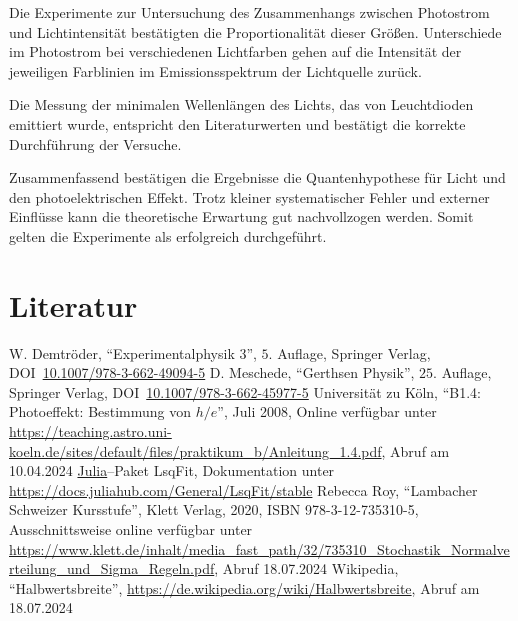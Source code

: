 \documentclass[12pt,a4paper]{scrartcl}
\numberwithin{equation}{section} %
\newcommand{\code}[1]{\textsf{#1}}
\begin{document}
Die Experimente zur Untersuchung des Zusammenhangs zwischen Photostrom und Lichtintensität bestätigten die Proportionalität dieser Größen. Unterschiede im Photostrom bei verschiedenen Lichtfarben gehen auf die Intensität der jeweiligen Farblinien im Emissionsspektrum der Lichtquelle zurück.

Die Messung der minimalen Wellenlängen des Lichts, das von Leuchtdioden emittiert wurde, entspricht den Literaturwerten und bestätigt die korrekte Durchführung der Versuche.

Zusammenfassend bestätigen die Ergebnisse die Quantenhypothese für Licht und den photoelektrischen Effekt. Trotz kleiner systematischer Fehler und externer Einflüsse kann die theoretische Erwartung gut nachvollzogen werden. Somit gelten die Experimente als erfolgreich durchgeführt.

\clearpage
\hypertarget{literatur}{%
\section{Literatur}\label{literatur}}
\renewcommand{\section}[2]{}

\begin{thebibliography}{99}
	W. Demtröder, ``Experimentalphysik 3'', $5.$ Auflage, Springer Verlag,
	DOI~\href{https://doi.org/10.1007/978-3-662-49094-5}{10.1007/978-3-662-49094-5}
	D. Meschede, ``Gerthsen Physik'', $25.$ Auflage, Springer Verlag,
	DOI~\href{https://doi.org/10.1007/978-3-662-45977-5}{10.1007/978-3-662-45977-5}
	Universität zu Köln, ``B1.4: Photoeffekt: Bestimmung von $h/e$'', Juli 2008,
	Online verfügbar unter \url{https://teaching.astro.uni-koeln.de/sites/default/files/praktikum_b/Anleitung_1.4.pdf},
	Abruf am 10.04.2024
	\code{\href{https://julialang.org}{Julia}}--Paket \code{LsqFit},
	Dokumentation unter \url{https://docs.juliahub.com/General/LsqFit/stable}
	Rebecca Roy, ``Lambacher Schweizer Kursstufe'', Klett Verlag, 2020, ISBN 978-3-12-735310-5, Ausschnittsweise online verfügbar unter \url{https://www.klett.de/inhalt/media_fast_path/32/735310_Stochastik_Normalverteilung_und_Sigma_Regeln.pdf},
	Abruf 18.07.2024
	Wikipedia, ``Halbwertsbreite'', \url{https://de.wikipedia.org/wiki/Halbwertsbreite}, Abruf am 18.07.2024
\end{thebibliography}
\end{document}
